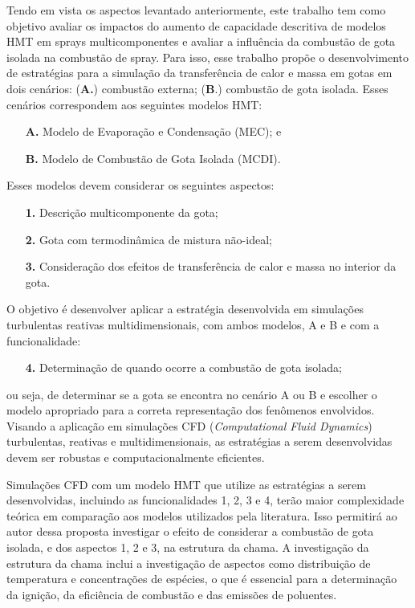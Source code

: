 Tendo em vista os aspectos levantado anteriormente, este trabalho tem como objetivo avaliar os impactos do aumento de capacidade descritiva de modelos HMT em sprays multicomponentes e avaliar a influência da combustão de gota isolada na combustão de spray.
Para isso, esse trabalho propõe o desenvolvimento de estratégias para a simulação da transferência de calor e massa em gotas em dois cenários: (\textbf{A.}) combustão externa; (\textbf{B}.) combustão de gota isolada.
Esses cenários correspondem aos seguintes modelos HMT:
\begin{enumerate}
    \item[\textbf{A.}] Modelo de Evaporação e Condensação (MEC); e 
    \item[\textbf{B.}] Modelo de Combustão de Gota Isolada (MCDI).
\end{enumerate}
Esses modelos devem considerar os seguintes aspectos: 
\begin{enumerate}
    \item[\textbf{1.}] Descrição multicomponente da gota; 
    \item[\textbf{2.}] Gota com termodinâmica de mistura não-ideal; 
    \item[\textbf{3.}] Consideração dos efeitos de transferência	de calor e massa no interior da gota. 
\end{enumerate}
O objetivo é desenvolver aplicar a estratégia desenvolvida em simulações turbulentas reativas multidimensionais, com ambos modelos, {A} e {B} e com a funcionalidade:
\begin{enumerate}
    \item[\textbf{4.}] Determinação de quando ocorre a combustão de gota isolada;
\end{enumerate}
ou seja, de determinar se a gota se encontra no cenário {A} ou {B} e escolher o modelo apropriado para a correta representação dos fenômenos envolvidos.
Visando a aplicação em simulações CFD (\emph{Computational Fluid Dynamics}) turbulentas, reativas e multidimensionais, as estratégias a serem desenvolvidas devem ser robustas e computacionalmente eficientes.

Simulações CFD com um modelo HMT que utilize as estratégias a serem desenvolvidas, incluindo as funcionalidades {1}, {2}, {3} e {4}, terão maior complexidade teórica em comparação aos modelos utilizados pela literatura. 
Isso permitirá ao autor dessa proposta investigar o efeito de considerar a combustão de gota isolada, e dos aspectos {1}, {2} e {3}, na estrutura da chama.
A investigação da estrutura da chama inclui a investigação de aspectos como distribuição de temperatura e concentrações de espécies, o que é essencial para a determinação da ignição, da eficiência de combustão e das emissões de poluentes.
